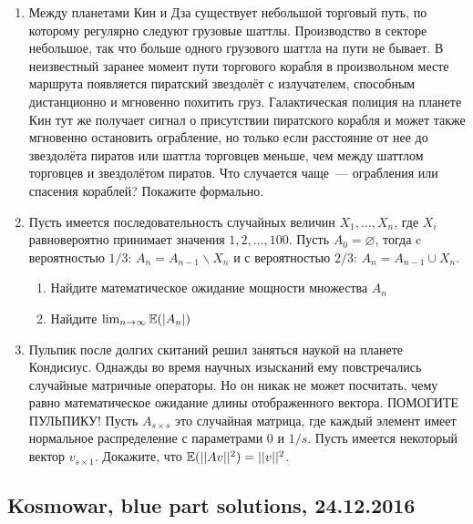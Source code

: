 \documentclass[12pt, a4paper]{article}\usepackage[]{graphicx}\usepackage[]{color}
\begin{document}
\begin{enumerate}
\item Между планетами Кин и Дза существует небольшой торговый путь, по которому регулярно следуют грузовые шаттлы. Производство в секторе небольшое, так что больше одного грузового шаттла на пути не бывает. В неизвестный заранее момент пути торгового корабля в произвольном месте маршрута появляется пиратский звездолёт с излучателем, способным дистанционно и мгновенно похитить груз. Галактическая полиция на планете Кин тут же получает сигнал о присутствии пиратского корабля и может также мгновенно остановить ограбление, но только если расстояние от нее до звездолёта пиратов или шаттла торговцев меньше, чем между шаттлом торговцев и звездолётом пиратов. Что случается чаще~--- ограбления или спасения кораблей? Покажите формально.

\item Пусть имеется последовательность случайных величин $X_1, \ldots, X_n$, где $X_i$ равновероятно принимает значения $1, 2, \ldots, 100$. Пусть $A_0 = \varnothing$, тогда c вероятностью $1/3$: $A_n = A_{n-1} \backslash X_n$ и с вероятностью $2/3$: $A_n = A_{n-1} \cup X_n$.

\begin{enumerate}
\item Найдите математическое ожидание мощности множества $A_n$
\item Найдите $\lim_{n \rightarrow \infty} \mathbb{E} (|A_n|)$
\end{enumerate}

\item  Пульпик после долгих скитаний решил заняться наукой на планете Кондисиус. Однажды во время научных изысканий ему повстречались случайные матричные операторы. Но он никак не может посчитать, чему равно математическое ожидание длины отображенного вектора. ПОМОГИТЕ ПУЛЬПИКУ! Пусть $A_{s \times s}$ это случайная матрица, где каждый элемент имеет нормальное распределение с параметрами $0$ и $1/s$. Пусть имеется некоторый вектор $v_{s \times 1}$. Докажите, что $\mathbb{E}(||Av||^2) = ||v||^2$.
\end{enumerate}

\subsection{Kosmowar, blue part solutions, 24.12.2016}
\end{document}
